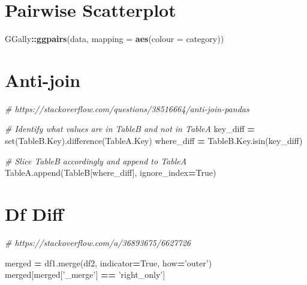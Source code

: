 \documentclass[]{book}
\newenvironment{Shaded}{\begin{snugshade}}{\end{snugshade}}
\newcommand{\BuiltInTok}[1]{#1}
\newcommand{\CommentTok}[1]{\textcolor[rgb]{0.56,0.35,0.01}{\textit{#1}}}
\newcommand{\DataTypeTok}[1]{\textcolor[rgb]{0.13,0.29,0.53}{#1}}
\newcommand{\KeywordTok}[1]{\textcolor[rgb]{0.13,0.29,0.53}{\textbf{#1}}}
\newcommand{\NormalTok}[1]{#1}
\newcommand{\OperatorTok}[1]{\textcolor[rgb]{0.81,0.36,0.00}{\textbf{#1}}}
\newcommand{\StringTok}[1]{\textcolor[rgb]{0.31,0.60,0.02}{#1}}
\newcommand{\VariableTok}[1]{\textcolor[rgb]{0.00,0.00,0.00}{#1}}
\begin{document}
\hypertarget{pairwise-scatterplot}{%
\section{Pairwise Scatterplot}\label{pairwise-scatterplot}}

\begin{Shaded}
\begin{Highlighting}[]
\NormalTok{GGally}\OperatorTok{::}\KeywordTok{ggpairs}\NormalTok{(data, }\DataTypeTok{mapping =} \KeywordTok{aes}\NormalTok{(}\DataTypeTok{colour =}\NormalTok{ category))}
\end{Highlighting}
\end{Shaded}

\hypertarget{anti-join}{%
\section{Anti-join}\label{anti-join}}

\begin{Shaded}
\begin{Highlighting}[]
\CommentTok{# https://stackoverflow.com/questions/38516664/anti-join-pandas}

\CommentTok{# Identify what values are in TableB and not in TableA}
\NormalTok{key_diff }\OperatorTok{=} \BuiltInTok{set}\NormalTok{(TableB.Key).difference(TableA.Key)}
\NormalTok{where_diff }\OperatorTok{=}\NormalTok{ TableB.Key.isin(key_diff)}

\CommentTok{# Slice TableB accordingly and append to TableA}
\NormalTok{TableA.append(TableB[where_diff], ignore_index}\OperatorTok{=}\VariableTok{True}\NormalTok{)}
\end{Highlighting}
\end{Shaded}

\hypertarget{df-diff}{%
\section{Df Diff}\label{df-diff}}

\begin{Shaded}
\begin{Highlighting}[]
\CommentTok{# https://stackoverflow.com/a/36893675/6627726}

\NormalTok{merged }\OperatorTok{=}\NormalTok{ df1.merge(df2, indicator}\OperatorTok{=}\VariableTok{True}\NormalTok{, how}\OperatorTok{=}\StringTok{'outer'}\NormalTok{)}
\NormalTok{merged[merged[}\StringTok{'_merge'}\NormalTok{] }\OperatorTok{==} \StringTok{'right_only'}\NormalTok{]}
\end{Highlighting}
\end{Shaded}
\end{document}
